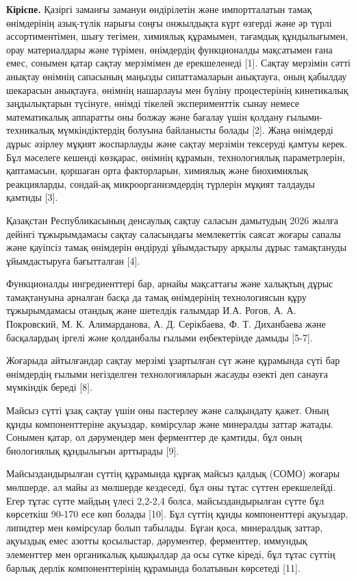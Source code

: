 \begin{multicols}{2}
{\bfseries Кіріспе.} Қазіргі заманғы замануи өндірілетін және импортталатын
тамақ өнімдерінің азық-түлік нарығы соңғы онжылдықта күрт өзгерді және
әр түрлі ассортиментімен, шығу тегімен, химиялық құрамымен, тағамдық
құндылығымен, орау материалдары және түрімен, өнімдердің функционалды
мақсатымен ғана емес, сонымен қатар сақтау мерзімімен де ерекшеленеді
{[}1{]}. Сақтау мерзімін сәтті анықтау өнімнің сапасының маңызды
сипаттамаларын анықтауға, оның қабылдау шекарасын анықтауға, өнімнің
нашарлауы мен бүліну процестерінің кинетикалық заңдылықтарын түсінуге,
өнімді тікелей эксперименттік сынау немесе математикалық аппаратты оны
болжау және бағалау үшін қолдану ғылыми-техникалық мүмкіндіктердің
болуына байланысты болады {[}2{]}. Жаңа өнімдерді дұрыс әзірлеу мұқият
жоспарлауды және сақтау мерзімін тексеруді қамтуы керек. Бұл мәселеге
кешенді көзқарас, өнімнің құрамын, технологиялық параметрлерін,
қаптамасын, қоршаған орта факторларын, химиялық және биохимиялық
реакцияларды, сондай-ақ микроорганизмдердің түрлерін мұқият талдауды
қамтиды {[}3{]}.

Қазақстан Республикасының денсаулық сақтау саласын дамытудың 2026 жылға
дейінгі тұжырымдамасы сақтау саласындағы мемлекеттік саясат жоғары
сапалы және қауіпсіз тамақ өнімдерін өндіруді ұйымдастыру арқылы дұрыс
тамақтануды ұйымдастыруға бағытталған {[}4{]}.

Функционалды ингредиенттері бар, арнайы мақсаттағы және халықтың дұрыс
тамақтануына арналған басқа да тамақ өнімдерінің технологиясын құру
тұжырымдамасы отандық және шетелдік ғалымдар И.А. Рогов, А. А.
Покровский, М. К. Алимарданова, А. Д. Серікбаева, Ф. Т. Диханбаева және
басқалардың іргелі және қолданбалы ғылыми еңбектерінде дамыды {[}5-7{]}.

Жоғарыда айтылғандар сақтау мерзімі ұзартылған сүт және құрамында сүті
бар өнімдердің ғылыми негізделген технологияларын жасауды өзекті деп
санауға мүмкіндік береді {[}8{]}.

Майсыз сүтті ұзақ сақтау үшін оны пастерлеу және салқындату қажет. Оның
құнды компоненттеріне ақуыздар, көмірсулар және минералды заттар жатады.
Сонымен қатар, ол дәрумендер мен ферменттер де қамтиды, бұл оның
биологиялық құндылығын арттырады {[}9{]}.

Майсыздандырылған сүттің құрамында құрғақ майсыз қалдық (СОМО) жоғары
мөлшерде, ал майы аз мөлшерде кездеседі, бұл оны тұтас сүттен
ерекшелейді. Егер тұтас сүтте майдың үлесі 2,2-2,4 болса,
майсыздандырылған сүтте бұл көрсеткіш 90-170 есе көп болады {[}10{]}.
Бұл сүттің құнды компоненттері ақуыздар, липидтер мен көмірсулар болып
табылады. Бұған қоса, минералдық заттар, ақуыздық емес азотты
қосылыстар, дәрументер, ферменттер, иммундық элементтер мен органикалық
қышқылдар да осы сүтке кіреді, бұл тұтас сүттің барлық дерлік
компоненттерінің құрамында болатынын көрсетеді {[}11{]}.
\end{multicols}

